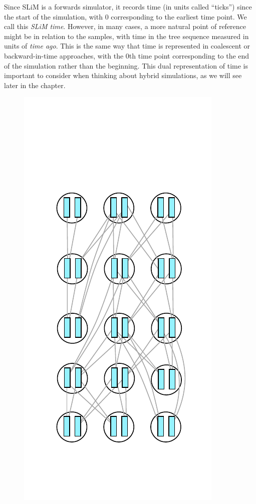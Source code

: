 \documentclass[12pt]{article}
\begin{document}
Since SLiM is a forwards simulator, it records time (in units called ``ticks'')
since the start of the simulation, with 0 corresponding to the earliest time point.
We call this \textit{SLiM time}.
However, in many cases, a more natural point of reference might be in relation to the samples, with
time in the tree sequence measured in units of \textit{time ago}. This is the same way that time
is represented in coalescent or backward-in-time approaches, with the 0th time point corresponding
to the end of the simulation rather than the beginning. This dual representation of time is important
to consider when thinking about hybrid simulations, as we will see later in the chapter.

\begin{figure}
\centering
    \includegraphics{figures/pedigree0}

\end{figure}
\end{document}
